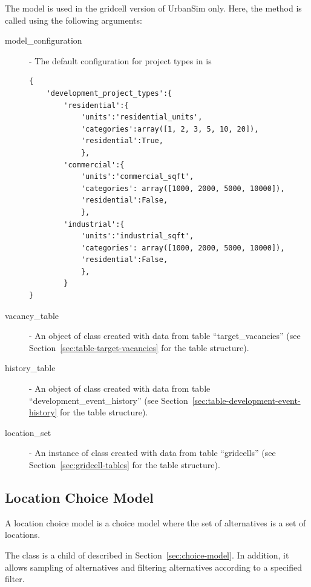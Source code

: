 The model is used in the gridcell version of UrbanSim only. Here,
the method  is called using the
following arguments:
\begin{description}
\item[model_configuration] \modelsindex - The default configuration for project types in
   is \label{page:model-configuration}
\begin{verbatim}
{
    'development_project_types':{
        'residential':{
            'units':'residential_units',
            'categories':array([1, 2, 3, 5, 10, 20]),
            'residential':True,
            },
        'commercial':{
            'units':'commercial_sqft',
            'categories': array([1000, 2000, 5000, 10000]),
            'residential':False,
            },
        'industrial':{
            'units':'industrial_sqft',
            'categories': array([1000, 2000, 5000, 10000]),
            'residential':False,
            },
        }
}
\end{verbatim}
\item[vacancy_table] - An object of class  created
  with data from table ``target_vacancies'' (see
  Section~\ref{sec:table-target-vacancies} for the table structure).
\item[history_table] - An object of class  created
  with data from table ``development_event_history'' (see
  Section~\ref{sec:table-development-event-history} for the  table structure).
\item[location_set] - An instance of class  created with
  data from table ``gridcells'' (see Section~\ref{sec:gridcell-tables} for the
  table structure).
\end{description}



\subsection{Location Choice Model}
\label{sec:location-choice-model}
A location choice model \modelsindex is a choice model \modelsindex where the set of alternatives is a
set of locations.

The class  \modelsindex is a child of  \modelsindex
described in Section~\ref{sec:choice-model}. In addition, it allows sampling
of alternatives and filtering alternatives according to a specified filter.

